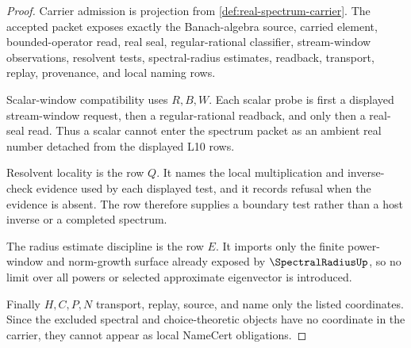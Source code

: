 \begin{proof}
Carrier admission is projection from \autoref{def:real-spectrum-carrier}. The accepted packet exposes exactly the Banach-algebra source, carried element, bounded-operator read, real seal, regular-rational classifier, stream-window observations, resolvent tests, spectral-radius estimates, readback, transport, replay, provenance, and local naming rows.

Scalar-window compatibility uses $R,B,W$. Each scalar probe is first a displayed stream-window request, then a regular-rational readback, and only then a real-seal read. Thus a scalar cannot enter the spectrum packet as an ambient real number detached from the displayed L10 rows.

Resolvent locality is the row $Q$. It names the local multiplication and inverse-check evidence used by each displayed test, and it records refusal when the evidence is absent. The row therefore supplies a boundary test rather than a host inverse or a completed spectrum.

The radius estimate discipline is the row $E$. It imports only the finite power-window and norm-growth surface already exposed by $\SpectralRadiusUp$, so no limit over all powers or selected approximate eigenvector is introduced.

Finally $H,C,P,N$ transport, replay, source, and name only the listed coordinates. Since the excluded spectral and choice-theoretic objects have no coordinate in the carrier, they cannot appear as local NameCert obligations.
\end{proof}


\begin{closurestatus}{\RealSpectrumUp}
  \theoryclosure{\seedClosure}
  \formalstatus{\unformalizedV}
\end{closurestatus}
